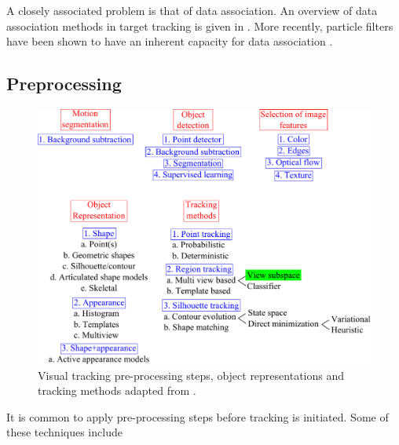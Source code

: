 A closely associated problem is that of data association.  An overview of data association methods in target tracking is given in \cite{1993_JNL_SURVEYcorresp_Cox}.  More recently, particle filters have been shown to have an inherent capacity for data association \cite{1998_JNL_Condensation_IsardBlake}.   

\subsection{Preprocessing}
\begin{figure}[t]
	\center
	\includegraphics[width=1.15\textwidth]{thesis/TRK_overview.pdf}
	\caption{Visual tracking pre-processing steps, object representations and tracking methods adapted from \cite{2006_JNL_SURVEYtrk_Yilmaz}.}
	\label{TRK_overviewDiagram}
\end{figure}


It is common to apply pre-processing steps before tracking is initiated.  Some of these techniques include 

